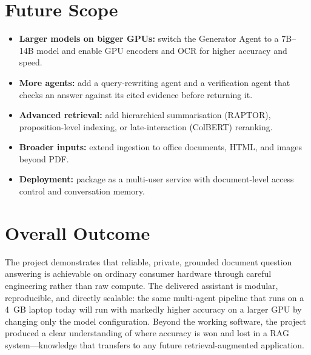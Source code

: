 \documentclass[12pt,a4paper]{report}
\begin{document}
\section{Future Scope}
\begin{itemize}[leftmargin=1.4em]
  \item \textbf{Larger models on bigger GPUs:} switch the Generator Agent to a
        7B--14B model and enable GPU encoders and OCR for higher accuracy and speed.
  \item \textbf{More agents:} add a query-rewriting agent and a verification agent
        that checks an answer against its cited evidence before returning it.
  \item \textbf{Advanced retrieval:} add hierarchical summarisation (RAPTOR),
        proposition-level indexing, or late-interaction (ColBERT) reranking.
  \item \textbf{Broader inputs:} extend ingestion to office documents, HTML, and
        images beyond PDF.
  \item \textbf{Deployment:} package as a multi-user service with document-level
        access control and conversation memory.
\end{itemize}

\section{Overall Outcome}
The project demonstrates that reliable, private, grounded document question
answering is achievable on ordinary consumer hardware through careful engineering
rather than raw compute. The delivered assistant is modular, reproducible, and
directly scalable: the same multi-agent pipeline that runs on a 4~GB laptop today
will run with markedly higher accuracy on a larger GPU by changing only the model
configuration. Beyond the working software, the project produced a clear
understanding of where accuracy is won and lost in a RAG system---knowledge that
transfers to any future retrieval-augmented application.
\end{document}
